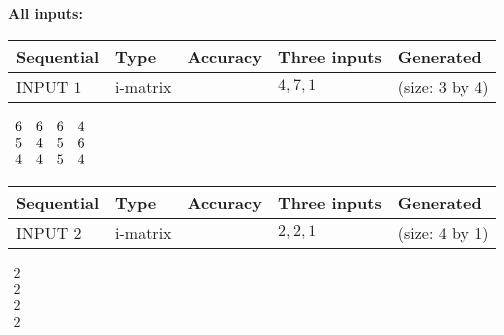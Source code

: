 \documentclass[12pt]{article}
\begin{document}
   
\noindent\vspace{0.1in}\hspace{-0.08in} {\textbf{\Large{All inputs: }}}
   
   
  
  
\noindent\begin{tabular}{|l|l|l|l|l|}
\hline
 Sequential & Type & Accuracy & Three inputs & Generated \\ 
\hline
 
 
  INPUT $           1$ & i-matrix &  & $
 4
 , 
 7
 , 
 1
 $ & (size:           3 by           4)
 \\  \hline  
 \end{tabular}
   
   
 $\begin{array}{
 c
 c
 c
 c
 }
           6 & 
           6 & 
           6 & 
           4 \\ 
           5 & 
           4 & 
           5 & 
           6 \\ 
           4 & 
           4 & 
           5 & 
           4
\end{array}  $ 
  
  
\noindent\begin{tabular}{|l|l|l|l|l|}
\hline
 Sequential & Type & Accuracy & Three inputs & Generated \\ 
\hline
 
 
  INPUT $           2$ & i-matrix &  & $
 2
 , 
 2
 , 
 1
 $ & (size:           4 by           1)
 \\  \hline  
 \end{tabular}
   
   
 $\begin{array}{
 c
 }
           2 \\ 
           2 \\ 
           2 \\ 
           2
\end{array}  $ 
  
\end{document}
